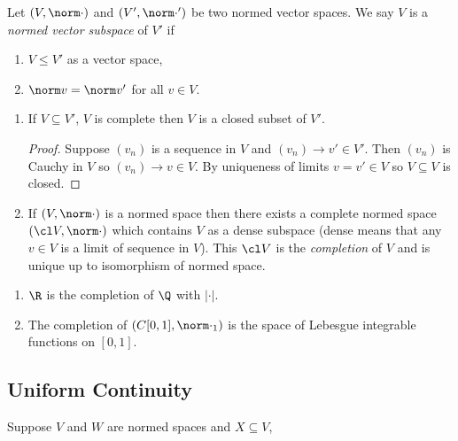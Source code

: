 \documentclass[a4paper]{article}
\theoremstyle{definition}
\begin{document}
\begin{definition}
  Let \((V, \norm \cdot)\) and \((V', \norm \cdot')\) be two normed vector spaces. We say \(V\) is a \emph{normed vector subspace} of \(V'\) if
  \begin{enumerate}
  \item \(V \leq V'\) as a vector space,
  \item \(\norm v = \norm v'\) for all \(v \in V\).
  \end{enumerate}

\end{definition}

\begin{remark}\leavevmode
  \begin{enumerate}
  \item If \(V \subseteq V'\), \(V\) is complete then \(V\) is a closed subset of \(V'\).
    \begin{proof}
      Suppose \((v_n)\) is a sequence in \(V\) and \((v_n) \to v' \in V'\). Then \((v_n)\) is Cauchy in \(V\) so \((v_n) \to v \in V\). By uniqueness of limits \(v = v' \in V\) so \(V \subseteq V\) is closed.
    \end{proof}
  \item If \((V, \norm \cdot)\) is a normed space then there exists a complete normed space \((\cl V, \norm \cdot)\) which contains \(V\) as a dense subspace (dense means that any \(v \in V\) is a limit of sequence in \(V\)). This \(\cl V\) is the \emph{completion} of \(V\) and is unique up to isomorphism of normed space.
  \end{enumerate}
\end{remark}

\begin{eg}\leavevmode
  \begin{enumerate}
  \item \(\R\) is the completion of \(\Q\) with \(|\cdot|\).
  \item The completion of \((C[0, 1], \norm \cdot_1)\) is the space of Lebesgue integrable functions on \([0, 1]\).
    \end{enumerate}
\end{eg}

\subsection{Uniform Continuity}

Suppose \(V\) and \(W\) are normed spaces and \(X \subseteq V\),
\end{document}
